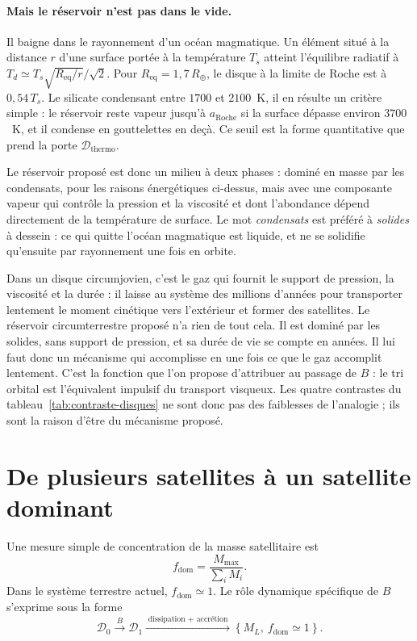 \documentclass[11pt,a4paper,openany]{report}
\newcommand{\Rt}{R_{\oplus}}
\newcommand{\Req}{R_{\mathrm{eq}}}
\newcommand{\aR}{a_{\mathrm{Roche}}}
\begin{document}
\paragraph{Mais le réservoir n'est pas dans le vide.} Il baigne dans le rayonnement d'un océan
magmatique. Un élément situé à la distance $r$ d'une surface portée à la température $T_s$ atteint
l'équilibre radiatif à $T_d\simeq T_s\sqrt{\Req/r}/\sqrt2$. Pour $\Req=1{,}7\,\Rt$, le disque à la
limite de Roche est à $0{,}54\,T_s$. Le silicate condensant entre $1700$ et $2100$~K, il en résulte
un critère simple : le réservoir reste vapeur jusqu'à $\aR$ si la surface dépasse environ
$3700$~K, et il condense en gouttelettes en deçà. Ce seuil est la forme quantitative que prend la
porte $\mathcal{D}_{\mathrm{thermo}}$.

Le réservoir proposé est donc un milieu à deux phases : dominé en masse par les condensats, pour
les raisons énergétiques ci-dessus, mais avec une composante vapeur qui contrôle la pression et la
viscosité et dont l'abondance dépend directement de la température de surface. Le mot
\emph{condensats} est préféré à \emph{solides} à dessein : ce qui quitte l'océan magmatique est
liquide, et ne se solidifie qu'ensuite par rayonnement une fois en orbite.

\begin{ideephys}
Dans un disque circumjovien, c'est le gaz qui fournit le support de pression, la viscosité et la
durée : il laisse au système des millions d'années pour transporter lentement le moment cinétique
vers l'extérieur et former des satellites. Le réservoir circumterrestre proposé n'a rien de tout
cela. Il est dominé par les solides, sans support de pression, et sa durée de vie se compte en
années. Il lui faut donc un mécanisme qui accomplisse en une fois ce que le gaz accomplit
lentement. C'est la fonction que l'on propose d'attribuer au passage de $B$ : le tri orbital est
l'équivalent impulsif du transport visqueux. Les quatre contrastes du
tableau~\ref{tab:contraste-disques} ne sont donc pas des faiblesses de l'analogie ; ils sont la
raison d'être du mécanisme proposé.
\end{ideephys}

\section{De plusieurs satellites à un satellite dominant}

Une mesure simple de concentration de la masse satellitaire est
\begin{equation}
f_{\mathrm{dom}}=\frac{M_{\max}}{\sum_i M_i}.
\label{eq:fdom}
\end{equation}
Dans le système terrestre actuel, $f_{\mathrm{dom}}\simeq1$. Le rôle dynamique spécifique de
$B$ s'exprime sous la forme
\begin{equation}
\mathcal{D}_0\xrightarrow{\;B\;}\mathcal{D}_1
\xrightarrow{\;\text{dissipation + accrétion}\;}\left\{M_L,\ f_{\mathrm{dom}}\simeq1\right\}.
\label{eq:roleB}
\end{equation}
\end{document}
